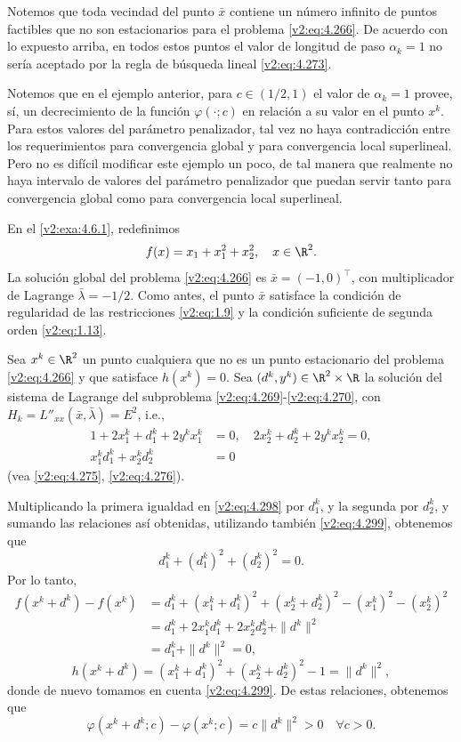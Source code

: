 Notemos que toda vecindad del punto $\bar{x}$ contiene un número infinito de puntos factibles que no son estacionarios para el problema \eqref{v2:eq:4.266}. De acuerdo con lo expuesto arriba, en todos estos puntos el valor de longitud de paso $\alpha_k = 1$ no sería aceptado por la regla de búsqueda lineal \eqref{v2:eq:4.273}.

Notemos que en el ejemplo anterior, para $c \in (1/2, 1)$ el valor de $\alpha_k = 1$ provee, sí, un decrecimiento de la función $\varphi(\cdot; c)$ en relación a su valor en el punto $x^k$. Para estos valores del parámetro penalizador, tal vez no haya contradicción entre los requerimientos para convergencia global y para convergencia local superlineal. Pero no es difícil modificar este ejemplo un poco, de tal manera que realmente no haya intervalo de valores del parámetro penalizador que puedan servir tanto para convergencia global como para convergencia local superlineal.

\begin{example}\label{v2:exa:4.6.2}
En el \cref{v2:exa:4.6.1}, redefinimos
\[
f(x) = x_1 + x_1^2 + x_2^2, \quad x \in \R^2.
\]
La solución global del problema \eqref{v2:eq:4.266} es $\bar{x} = (-1, 0)^\top$, con multiplicador de Lagrange $\bar{\lambda} = -1/2$. Como antes, el punto $\bar{x}$ satisface la condición de regularidad de las restricciones \eqref{v2:eq:1.9} y la condición suficiente de segunda orden \eqref{v2:eq:1.13}.

Sea $x^k \in \R^2$ un punto cualquiera que no es un punto estacionario del problema \eqref{v2:eq:4.266} y que satisface $h(x^k) = 0$. Sea $(d^k, y^k) \in \R^2 \times \R$ la solución del sistema de Lagrange del subproblema \eqref{v2:eq:4.269}-\eqref{v2:eq:4.270}, con $H_k = L''_{xx}(\bar{x}, \bar{\lambda}) = E^2$, i.e.,
\begin{align}
1 + 2x_1^k + d_1^k + 2y^k x_1^k &= 0, \quad 2x_2^k + d_2^k + 2y^k x_2^k = 0, \label{v2:eq:4.298} \\
x_1^k d_1^k + x_2^k d_2^k &= 0 \label{v2:eq:4.299}
\end{align}
(vea \eqref{v2:eq:4.275}, \eqref{v2:eq:4.276}).

Multiplicando la primera igualdad en \eqref{v2:eq:4.298} por $d_1^k$, y la segunda por $d_2^k$, y sumando las relaciones así obtenidas, utilizando también \eqref{v2:eq:4.299}, obtenemos que
\[
d_1^k + (d_1^k)^2 + (d_2^k)^2 = 0.
\]
Por lo tanto,
\begin{align*}
f(x^k + d^k) - f(x^k) &= d_1^k + (x_1^k + d_1^k)^2 + (x_2^k + d_2^k)^2 - (x_1^k)^2 - (x_2^k)^2 \\
&= d_1^k + 2x_1^k d_1^k + 2x_2^k d_2^k + \|d^k\|^2 \\
&= d_1^k + \|d^k\|^2 = 0,
\end{align*}
\[
h(x^k + d^k) = (x_1^k + d_1^k)^2 + (x_2^k + d_2^k)^2 - 1 = \|d^k\|^2,
\]
donde de nuevo tomamos en cuenta \eqref{v2:eq:4.299}. De estas relaciones, obtenemos que
\[
\varphi(x^k + d^k; c) - \varphi(x^k; c) = c \|d^k\|^2 > 0 \quad \forall c > 0.
\]
\end{example}

